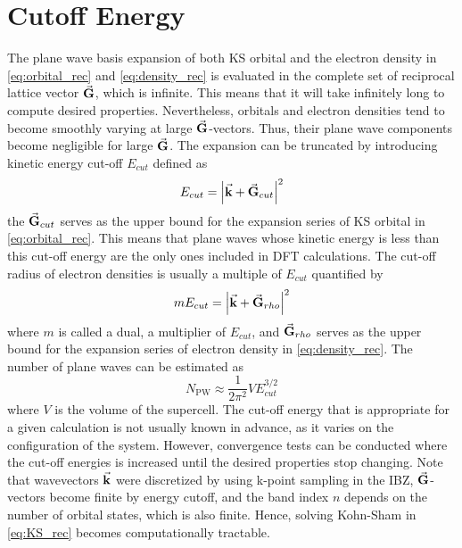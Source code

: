 \section{Cutoff Energy }
The plane wave basis expansion of both KS orbital and the electron density in \eqref{eq:orbital_rec} and \eqref{eq:density_rec} is evaluated in the complete set of reciprocal lattice vector $\va{G}$, which is infinite. This means that it will take infinitely long to compute desired properties. Nevertheless, orbitals and electron densities tend to become smoothly varying at large $\va{G}$-vectors. Thus, their plane wave components become negligible for large $\va{G}$. The expansion can be truncated by introducing kinetic energy cut-off $E_{cut}$ defined as 
\begin{equation}
    E_{cut} = \abs{\va{k} + \va{G}_{cut}}^2
\end{equation}
the $\va{G}_{cut}$ serves as the upper bound for the expansion series of KS orbital in \eqref{eq:orbital_rec}. This means that plane waves whose kinetic energy is less than this cut-off energy are the only ones included in DFT calculations. The cut-off radius of electron densities is usually a multiple of $E_{cut}$ quantified by 
\begin{equation}
    m E_{cut} = \abs{\va{k} + \va{G}_{rho}}^2
\end{equation}
where $m$ is called a dual, a multiplier of $E_{cut}$, and $\va{G}_{rho}$ serves as the upper bound for the expansion series of electron density in \eqref{eq:density_rec}. The number of plane waves can be estimated as 
\begin{equation}
    N_{\text{PW}} \approx \frac{1}{2 \pi^2} V E_{cut}^{3/2}
\end{equation}
where $V$ is the volume of the supercell. The cut-off energy that is  appropriate for a given calculation is  not usually known in advance, as it varies on the configuration of the system. However, convergence tests can be conducted  where the cut-off energies is increased until the desired properties stop changing. Note that wavevectors $\va{k}$ were discretized by using k-point sampling in the IBZ, $\va{G}$-vectors become finite by energy cutoff,  and the band index $n$ depends on the number of orbital states, which is also finite. Hence, solving Kohn-Sham in \eqref{eq:KS_rec} becomes computationally tractable. 

